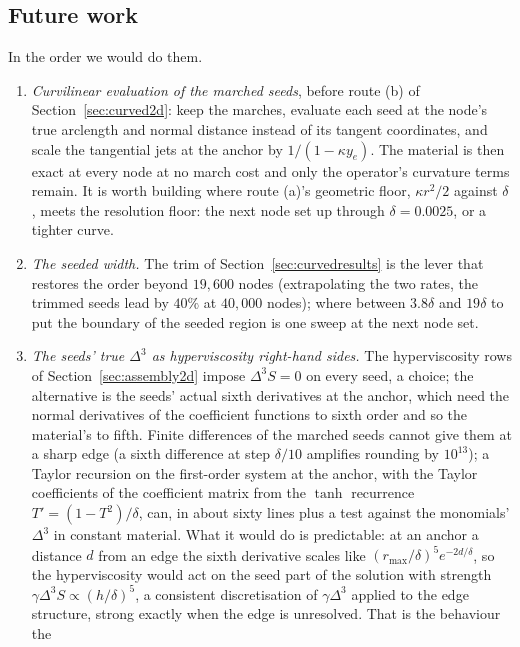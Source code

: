 \documentclass[11pt]{amsart}
\theoremstyle{definition}
\theoremstyle{remark}
\begin{document}
\subsection{Future work}
\label{sec:futurework}
In the order we would do them.
\begin{enumerate}
\item \emph{Curvilinear evaluation of the marched seeds}, before route
  (b) of Section~\ref{sec:curved2d}: keep the marches, evaluate each
  seed at the node's true arclength and normal distance instead of its
  tangent coordinates, and scale the tangential jets at the anchor by
  $1 / (1 - \kappa y_e)$. The material is then exact at every node at
  no march cost and only the operator's curvature terms remain. It is
  worth building where route (a)'s geometric floor, $\kappa r^2 / 2$
  against $\delta$, meets the resolution floor: the next node set up
  through $\delta = 0.0025$, or a tighter curve.
\item \emph{The seeded width.} The trim of
  Section~\ref{sec:curvedresults} is the lever that restores the order
  beyond $19{,}600$ nodes (extrapolating the two rates, the trimmed
  seeds lead by $40\%$ at $40{,}000$ nodes); where between $3.8\delta$
  and $19\delta$ to put the boundary of the seeded region is one sweep
  at the next node set.
\item \emph{The seeds' true $\Delta^3$ as hyperviscosity right-hand
  sides.} The hyperviscosity rows of Section~\ref{sec:assembly2d}
  impose $\Delta^3 S = 0$ on every seed, a choice; the alternative is
  the seeds' actual sixth derivatives at the anchor, which need the
  normal derivatives of the coefficient functions to sixth order and so
  the material's to fifth. Finite differences of the marched seeds
  cannot give them at a sharp edge (a sixth difference at step
  $\delta / 10$ amplifies rounding by $10^{13}$); a Taylor recursion on
  the first-order system at the anchor, with the Taylor coefficients of
  the coefficient matrix from the $\tanh$ recurrence
  $T' = (1 - T^2) / \delta$, can, in about sixty lines plus a test
  against the monomials' $\Delta^3$ in constant material. What it would
  do is predictable: at an anchor a distance $d$ from an edge the sixth
  derivative scales like $(r_{\max} / \delta)^5 e^{-2d / \delta}$, so
  the hyperviscosity would act on the seed part of the solution with
  strength $\gamma \Delta^3 S \propto (h / \delta)^5$, a consistent
  discretisation of $\gamma \Delta^3$ applied to the edge structure,
  strong exactly when the edge is unresolved. That is the behaviour the

\end{enumerate}
\end{document}
